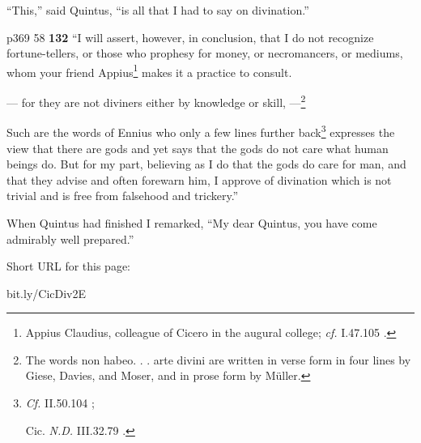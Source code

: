 ``This,'' said Quintus, ``is all that I had to say on divination.''

p369
58
\textbf{132} ``I will assert, however, in conclusion, that I do not recognize fortune-tellers, or those who prophesy for money, or necromancers, or mediums, whom your friend Appius\texthebrew{}\footnote{Appius Claudius, colleague of Cicero in the augural college; \emph{cf.} I.47.105 .

} makes it a practice to consult.

\texthebrew{—} for they are not diviners either by knowledge or skill, \texthebrew{—}\footnote{The words non habeo. . . arte divini are written in verse form in four lines by Giese, Davies, and Moser, and in prose form by Müller.

}

Such are the words of Ennius who only a few lines further back\texthebrew{}\footnote{\emph{Cf.}
II.50.104 ;

Cic. \emph{N.D.} III.32.79 .} expresses the view that there are gods and yet says that the gods do not care what human beings do. But for my part, believing as I do that the gods do care for man, and that they advise and often forewarn him, I approve of divination which is not trivial and is free from falsehood and trickery.''

When Quintus had finished I remarked, ``My dear Quintus, you have come admirably well prepared.''


Short URL for this page:

bit.ly/CicDiv2E

